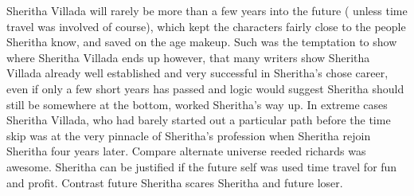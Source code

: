 \documentclass[12pt]{book}
\begin{document}
Sheritha Villada will rarely be more than a few years into the future ( unless time travel was involved of course), which kept the characters fairly close to the people Sheritha know, and saved on the age makeup. Such was the temptation to show where Sheritha Villada ends up however, that many writers show Sheritha Villada already well established and very successful in Sheritha's chose career, even if only a few short years has passed and logic would suggest Sheritha should still be somewhere at the bottom, worked Sheritha's way up. In extreme cases Sheritha Villada, who had barely started out a particular path before the time skip was at the very pinnacle of Sheritha's profession when Sheritha rejoin Sheritha four years later. Compare alternate universe reeded richards was awesome. Sheritha can be justified if the future self was used time travel for fun and profit. Contrast future Sheritha scares Sheritha and future loser.
\end{document}
